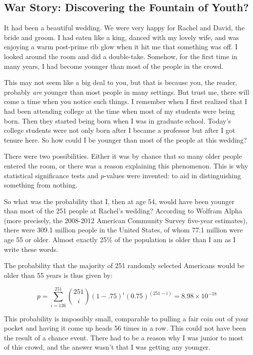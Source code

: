 \documentclass[10pt]{article}
\begin{document}
\subsection{War Story: Discovering the Fountain of Youth?}

It had been a beautiful wedding. We were very happy for Rachel and David, the bride and groom. I had eaten like a king, danced with my lovely wife, and was enjoying a warm post-prime rib glow when it hit me that something was off. I looked around the room and did a double-take. Somehow, for the first time in many years, I had become younger than most of the people in the crowd.

This may not seem like a big deal to you, but that is because you, the reader, probably \textit{are} younger than most people in many settings. But trust me, there will come a time when you notice such things. I remember when I first realized that I had been attending college at the time when most of my students were being born. Then they started being born when I was in graduate school. Today's college students were not only born after I became a professor but after I got tenure here. So how could I be younger than most of the people at this wedding?

There were two possibilities. Either it was by chance that so many older people entered the room, or there was a reason explaining this phenomenon. This is why statistical significance tests and $p$-values were invented: to aid in distinguishing something from nothing.

So what was the probability that I, then at age 54, would have been younger than most of the 251 people at Rachel's wedding? According to Wolfram Alpha (more precisely, the 2008-2012 American Community Survey five-year estimates), there were 309.1 million people in the United States, of whom 77.1 million were age 55 or older. Almost exactly 25\% of the population is older than I am as I write these words.

The probability that the majority of 251 randomly selected Americans would be older than 55 years is thus given by:

\[
p=\sum_{i=126}^{251}\binom{251}{i}(1-.75)^{i}(0.75)^{(251-i)}=8.98 \times 10^{-18}
\]

This probability is impossibly small, comparable to pulling a fair coin out of your pocket and having it come up heads 56 times in a row. This could not have been the result of a chance event. There had to be a reason why I was junior to most of this crowd, and the answer wasn't that I was getting any younger.
\end{document}
